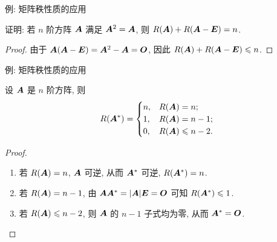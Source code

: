 \begin{frame}{例: 矩阵秩性质的应用}
	\onslide<+->
	\begin{example}
		证明: 若 $n$ 阶方阵 ${\boldsymbol{A}}$ 满足 ${\boldsymbol{A}}^2={\boldsymbol{A}}$, 则 $R(\bfA)+R(\bfA-\bfE)=n$.
	\end{example}
	\onslide<+->
	\begin{proof}
		由于 ${\boldsymbol{A}}({\boldsymbol{A}}-{\boldsymbol{E}})={\boldsymbol{A}}^2-{\boldsymbol{A}}={\boldsymbol{O}}$, 因此 $R({\boldsymbol{A}})+R({\boldsymbol{A}}-{\boldsymbol{E}})\leqslant n$.
		\onslide<+->{%
			故 $R(\bfA)+R(\bfA-\bfE)=n$.\qedhere
		}
	\end{proof}
\end{frame}


\begin{frame}{例: 矩阵秩性质的应用}
	\onslide<+->
	\begin{theorem}[伴随矩阵的秩]
		设 ${\boldsymbol{A}}$ 是 $n$ 阶方阵, 则
		\[R({\boldsymbol{A}}^*)=\begin{cases}
			n,&R({\boldsymbol{A}})=n;\\
			1,&R({\boldsymbol{A}})=n-1;\\
			0,&R({\boldsymbol{A}})\leqslant n-2.
		\end{cases}\]
	\end{theorem}
	\onslide<+->
	\begin{proof}
		\begin{enumerate}
			\item 若 $R({\boldsymbol{A}})=n$, ${\boldsymbol{A}}$ 可逆, 从而 ${\boldsymbol{A}}^*$ 可逆, $R({\boldsymbol{A}}^*)=n$.
			\item 若 $R({\boldsymbol{A}})=n-1$, 由 ${\boldsymbol{A}}{\boldsymbol{A}}^*=|{\boldsymbol{A}}|{\boldsymbol{E}}={\boldsymbol{O}}$ 可知 $R({\boldsymbol{A}}^*)\leqslant 1$.
			\onslide<+->{故 $R(\bfA^*)=1$.}
			\item 若 $R({\boldsymbol{A}})\leqslant n-2$, 则 ${\boldsymbol{A}}$ 的 $n-1$ 子式均为零, 从而 ${\boldsymbol{A}}^*={\boldsymbol{O}}$.\qedhere
		\end{enumerate}
	\end{proof}
\end{frame}


